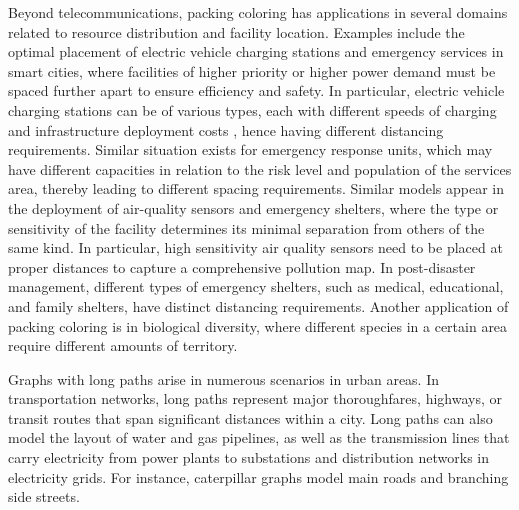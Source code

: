 \documentclass{article}
\begin{document}
Beyond telecommunications, packing coloring has applications in several domains related to 
resource distribution and facility location. Examples include the optimal placement of 
electric vehicle charging stations and emergency services in smart cities, 
where facilities of higher priority or higher power demand must be spaced further apart 
to ensure efficiency and safety. In particular, electric vehicle charging stations can be of various types, each with different speeds of charging and infrastructure deployment costs \cite{leijon2025evcharging}, hence having different distancing requirements. Similar situation exists for emergency response units, which may have different capacities in relation to the risk level and population of the services area, thereby leading to different spacing requirements. Similar models appear in the deployment of air-quality sensors 
and emergency shelters, where the type or sensitivity of the facility determines its minimal separation 
from others of the same kind. In particular, high sensitivity air quality sensors need to be placed at proper distances to capture a comprehensive pollution map. In post-disaster management, different types of emergency shelters, such as medical, educational, and family shelters, have distinct distancing requirements. Another application of packing coloring is in biological diversity, where different
species in a certain area require different amounts of territory.


Graphs with long paths arise in numerous scenarios in urban areas. In transportation networks, long paths represent major thoroughfares, highways, or transit routes that span significant distances within a city. Long paths can also model the layout of water and gas pipelines, as well as the transmission lines that carry electricity from power plants to substations and distribution networks in electricity grids. For instance, caterpillar graphs model main roads and branching side streets.
\end{document}
